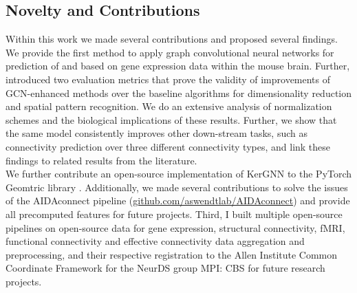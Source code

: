 \documentclass[]{article}
\renewcommand{\cite}{\citep}
\begin{document}
\subsection{Novelty and Contributions}
Within this work we made several contributions and proposed several findings. We provide the first method to apply graph convolutional neural networks for prediction of and based on gene expression data within the mouse brain. Further, introduced two evaluation metrics that prove the validity of improvements of GCN-enhanced methods over the baseline algorithms for dimensionality reduction and spatial pattern recognition. We do an extensive analysis of normalization schemes and the biological implications of these results. Further, we show that the same model consistently improves other down-stream tasks, such as connectivity prediction over three different connectivity types, and link these findings to related results from the literature.\\

We further contribute an open-source implementation of KerGNN \cite{feng2022kergnns} to the PyTorch Geomtric library \cite{PytorchGeometric}. Additionally, we made several contributions to solve the issues of the AIDAconnect pipeline (\href{https://github.com/aswendtlab/AIDAconnect}{github.com/aswendtlab/AIDAconnect}) and provide all precomputed features for future projects. Third, I built multiple open-source pipelines on open-source data for gene expression, structural connectivity, fMRI, functional connectivity and effective connectivity data aggregation and preprocessing, and their respective registration to the Allen Institute Common Coordinate Framework for the NeurDS group MPI: CBS for future research projects.
\end{document}
